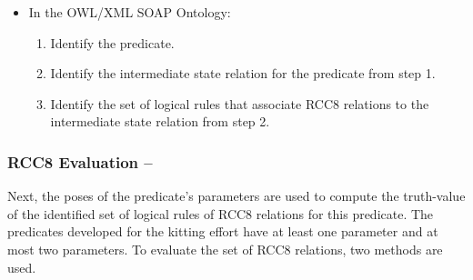 \begin{itemize}
\item[] In the \textsf{OWL/XML SOAP Ontology}:
\begin{enumerate}
 \item Identify the predicate.
 \item Identify the intermediate state relation for the predicate from step 1.
 \item Identify the set of logical rules that associate RCC8 relations to the intermediate state relation from step 2.
\end{enumerate}
\end{itemize}

\subsubsection{RCC8 Evaluation -- }
Next, the poses of the predicate's parameters are used to compute the truth-value of the identified set of logical rules of RCC8 relations for this predicate. The predicates developed for the kitting effort have at least one parameter and at most two parameters. To evaluate the set of RCC8 relations, two methods are used.


